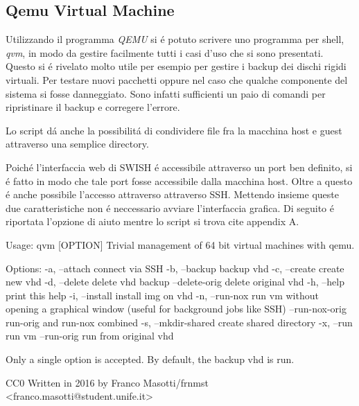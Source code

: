 \documentclass[10pt,titlepage,twoside,a4paper]{report}
\begin{document}
\subsection{Qemu Virtual Machine}
Utilizzando il programma \emph{QEMU}\cite{QEMU} si \'e potuto scrivere uno 
programma per 
shell, \emph{qvm}, in modo da gestire facilmente tutti i casi d'uso che si 
sono presentati\cite{qvm}. Questo si \'e rivelato molto utile per esempio per 
gestire i backup  dei dischi rigidi virtuali. Per testare nuovi 
pacchetti oppure nel caso che qualche componente del sistema si fosse 
danneggiato. Sono infatti sufficienti un paio di comandi per ripristinare il 
backup e corregere l'errore.

Lo script d\'a anche la possibilit\'a di condividere file fra la macchina host 
e guest attraverso una semplice directory.

Poich\'e l'interfaccia web di SWISH \'e accessibile attraverso un port ben 
definito, si \'e fatto in modo che tale port fosse accessibile dalla macchina 
host. Oltre a questo \'e anche possibile l'accesso attraverso attraverso SSH. 
Mettendo insieme queste due caratteristiche non \'e neccessario avviare 
l'interfaccia grafica. Di seguito \'e riportata l'opzione di aiuto mentre lo 
script si trova  cite appendix A.

\begin{listing}[H]
\begin{textcode*}{}
Usage: qvm [OPTION]
Trivial management of 64 bit virtual machines with qemu.

Options:
    -a, --attach                connect via SSH
    -b, --backup                backup vhd
    -c, --create                create new vhd
    -d, --delete                delete vhd backup
        --delete-orig           delete original vhd
    -h, --help                  print this help
    -i, --install               install img on vhd
    -n, --run-nox               run vm without opening a graphical window
                                (useful for background jobs like SSH)
        --run-nox-orig          run-orig and run-nox combined
    -s, --mkdir-shared          create shared directory
    -x, --run                   run vm
        --run-orig              run from original vhd


Only a single option is accepted.
By default, the backup vhd is run.

CC0
Written in 2016 by Franco Masotti/frnmst <franco.masotti@student.unife.it>
\end{textcode*}
\caption{Pagina di aiuto di qvm}
\end{listing}
\end{document}
